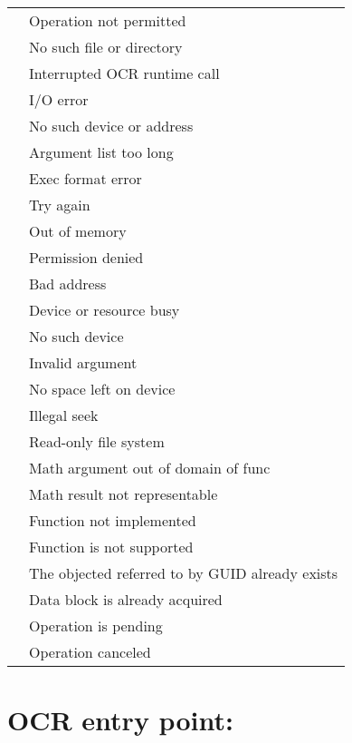 \begin{supertabular}{p{1.25in} p{2.75in}}
\label{tab:errorcodes}
 & Operation not permitted\\
 & No such file or directory\\
 & Interrupted OCR runtime call\\
 & I/O error\\
 & No such device or address\\
 & Argument list too long\\
 & Exec format error\\
 & Try again\\
 & Out of memory\\
 & Permission denied\\
 & Bad address\\
 & Device or resource busy\\
 & No such device\\
 & Invalid argument\\
 & No space left on device\\
 & Illegal seek\\
 & Read-only file system\\
 & Math argument out of domain of func\\
 & Math result not representable\\
 & Function not implemented\\
 & Function is not supported\\
 & The objected referred to by GUID already exists\\
 & Data block is already acquired\\
 & Operation is pending\\
 & Operation canceled\\
\end{supertabular}
\hypertarget{func_mainEdt}{
\section{OCR entry point: }}
\label{sec:mainEDT}

